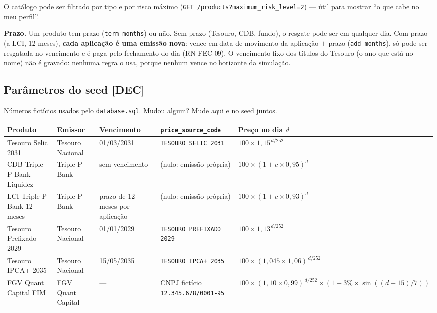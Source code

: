 \documentclass[11pt,a4paper]{article}
\newcommand{\banco}{Triple P Bank}            %
\newcommand{\fundo}{FGV Quant Capital}     %
\newcommand{\obr}{\textbf{[OBR]}}          %
\newcommand{\dec}{\textbf{[DEC]}}          %
\newcommand{\tb}[1]{\texttt{#1}}           %
\begin{document}
\begin{regras}
  \item[RN-PRO-08 \dec] O catálogo pode ser filtrado por tipo e por risco máximo
  (\tb{GET /products?maximum_risk_level=2}) --- útil para mostrar ``o que cabe no meu perfil''.
  \item[RN-PRO-09 \obr] \textbf{Prazo.} Um produto tem prazo (\tb{term_months}) ou não. Sem prazo
  (Tesouro, CDB, fundo), o resgate pode ser em qualquer dia. Com prazo (a LCI, 12 meses),
  \textbf{cada aplicação é uma emissão nova}: vence em data de movimento da aplicação $+$ prazo
  (\tb{add_months}), só pode ser resgatada no vencimento e é paga pelo fechamento do dia
  (RN-FEC-09). O vencimento fixo dos títulos do Tesouro (o ano que está no nome) não é gravado:
  nenhuma regra o usa, porque nenhum vence no horizonte da simulação.
\end{regras}

\subsection{Parâmetros do seed \dec}

Números fictícios usados pelo \tb{database.sql}. Mudou algum? Mude aqui e no seed juntos.

\begingroup\small
\begin{longtable}{@{}P{3.3cm}P{2.6cm}P{2.1cm}P{3.4cm}P{4.6cm}@{}}
\toprule
\textbf{Produto} & \textbf{Emissor} & \textbf{Vencimento} & \textbf{\tb{price_source_code}} & \textbf{Preço no dia $d$} \\
\midrule
\endhead
Tesouro Selic 2031 & Tesouro Nacional & 01/03/2031 & \tb{TESOURO SELIC 2031} & $100 \times 1{,}15^{\,d/252}$ \\
CDB \banco{} Liquidez & \banco & sem vencimento & (nulo: emissão própria) & $100 \times (1 + c \times 0{,}95)^{d}$ \\
LCI \banco{} 12 meses & \banco & prazo de 12 meses por aplicação & (nulo: emissão própria) & $100 \times (1 + c \times 0{,}93)^{d}$ \\
Tesouro Prefixado 2029 & Tesouro Nacional & 01/01/2029 & \tb{TESOURO PREFIXADO 2029} & $100 \times 1{,}13^{\,d/252}$ \\
Tesouro IPCA+ 2035 & Tesouro Nacional & 15/05/2035 & \tb{TESOURO IPCA+ 2035} & $100 \times (1{,}045 \times 1{,}06)^{\,d/252}$ \\
\fundo{} FIM & \fundo & --- & CNPJ fictício \tb{12.345.678/0001-95} & $100 \times (1{,}10 \times 0{,}99)^{\,d/252} \times (1 + 3\% \times \sin((d + 15)/7))$ \\
\bottomrule
\end{longtable}
\endgroup
\end{document}

